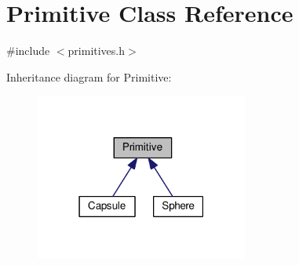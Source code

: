 \hypertarget{class_primitive}{}\section{Primitive Class Reference}
\label{class_primitive}


{\ttfamily \#include $<$primitives.\+h$>$}



Inheritance diagram for Primitive\+:\nopagebreak
\begin{figure}[H]
\begin{center}
\leavevmode
\includegraphics[width=198pt]{class_primitive__inherit__graph}
\end{center}
\end{figure}
